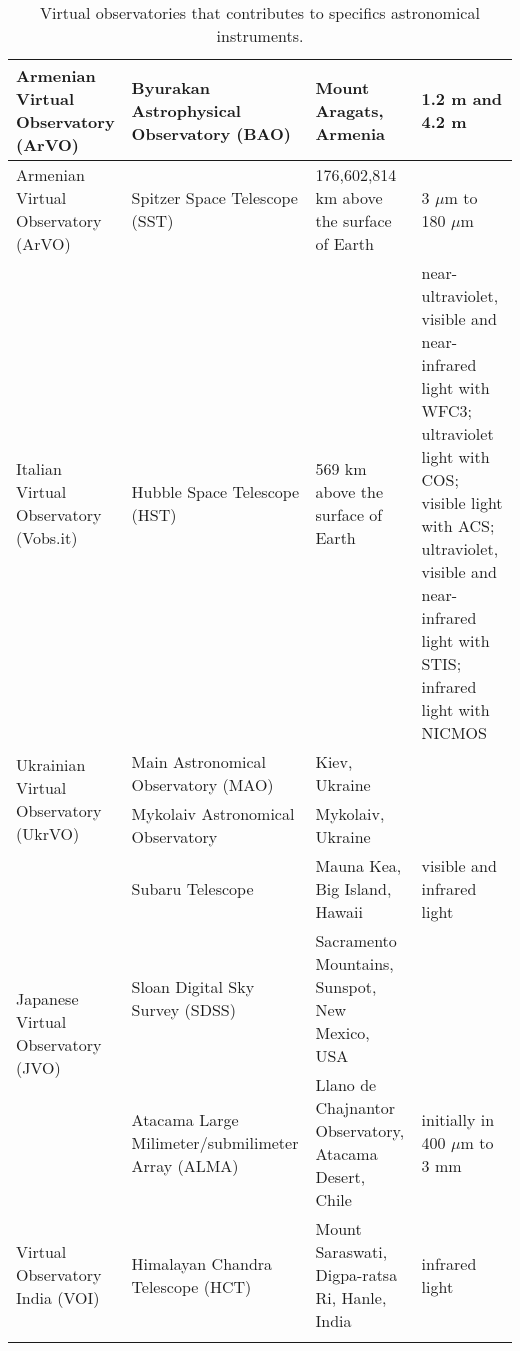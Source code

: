 \begin{center}
\begin{longtable}{|m{3cm}|m{3cm}|m{3cm}|m{5cm}|}
    \hline
    Armenian Virtual Observatory (ArVO) & Byurakan Astrophysical Observatory
    (BAO) & Mount Aragats, Armenia & 1.2 m and 4.2 m \cite{website:BAO_EMS} \\
    \hline
    Armenian Virtual Observatory (ArVO) & Spitzer Space Telescope (SST) &
    176,602,814 km above the surface of Earth & 3 $ \mu $m to 180 $ \mu $m \\
    \hline
    Italian Virtual Observatory (Vobs.it) & Hubble Space Telescope (HST) & 569
    km above the surface of Earth & near-ultraviolet, visible and near-infrared
    light with WFC3; ultraviolet light with COS; visible light with ACS;
    ultraviolet, visible and near-infrared light with STIS; infrared light with
    NICMOS \\
    \hline
    \multirow{2}{3cm}{Ukrainian Virtual Observatory (UkrVO)} & Main Astronomical
    Observatory (MAO) & Kiev, Ukraine & \\
     \cline{2-4}
     & Mykolaiv Astronomical Observatory & Mykolaiv, Ukraine & \\
    \hline
    \multirow{3}{3cm}{Japanese Virtual Observatory (JVO)} & Subaru Telescope &
    Mauna Kea, Big Island, Hawaii & visible and infrared light
    \cite{website:Subaru_EMS} \\
     \cline{2-4}
     & Sloan Digital Sky Survey (SDSS) & Sacramento Mountains, Sunspot, New
     Mexico, USA & \\
     \cline{2-4} 
     & Atacama Large Milimeter/submilimeter Array (ALMA) & Llano de Chajnantor
     Observatory, Atacama Desert, Chile & initially in 400 $ \mu $m to 3 mm \\
    \hline
    Virtual Observatory India (VOI) & Himalayan Chandra Telescope (HCT) & Mount
    Saraswati, Digpa-ratsa Ri, Hanle, India & infrared light 
    \cite{website:HCT_EMS} \\
    \hline
\caption{Virtual observatories that contributes to specifics astronomical
instruments.}
\label{table:vo_EMS}
\end{longtable}
\end{center}

